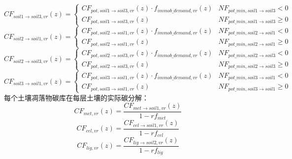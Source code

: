 \begin{equation}
    CF_{soil1 \rightarrow soil3, vr}(z)=\left\{\begin{array}{ll} CF_{pot, soil1 \rightarrow soil3, vr}(z) \cdot f_{immob\_demand, vr}(z) & NF_{pot\_{min, soil1 \rightarrow soil3}} <0 \\ 
    CF_{pot, soil1 \rightarrow soil3, vr}(z) & NF_{pot\_{min, soil1 \rightarrow soil3}} \geqslant 0
  \end{array}\right.
\end{equation}
\begin{equation}
    CF_{soil2 \rightarrow soil1, vr}(z)=\left\{\begin{array}{ll} CF_{pot, soil2 \rightarrow soil1, vr}(z) \cdot f_{immob\_demand, vr}(z) & NF_{pot\_{min, soil2 \rightarrow soil1}} <0 \\ 
    CF_{pot, soil2 \rightarrow soil1, vr}(z) & NF_{pot\_{min, soil2 \rightarrow soil1}} \geqslant 0
   \end{array}\right.
\end{equation}
\begin{equation}
    CF_{soil2 \rightarrow soil3, vr}(z)=\left\{\begin{array}{ll} CF_{pot, soil2 \rightarrow soil3, vr}(z) \cdot f_{immob\_demand, vr}(z) & NF_{pot\_{min, soil2 \rightarrow soil3}} <0 \\ 
    CF_{pot, soil2 \rightarrow soil3, vr}(z) & NF_{pot\_{min, soil2 \rightarrow soil3}} \geqslant 0
   \end{array}\right.
\end{equation}
\begin{equation}
    CF_{soil3 \rightarrow soil1, vr}(z)=\left\{\begin{array}{ll} CF_{pot, soil3 \rightarrow soil1, vr}(z) \cdot f_{immob\_demand, vr}(z) & NF_{pot\_{min, soil3 \rightarrow soil1}} <0 \\ 
    CF_{pot, soil3 \rightarrow soil1, vr}(z) & NF_{pot\_{min, soil3 \rightarrow soil1}} \geqslant 0
   \end{array}\right.
\end{equation}
每个土壤凋落物碳库在每层土壤的实际碳分解：
\begin{equation}
CF_{met, vr}(z)=\frac{CF_{met \rightarrow { soil1,vr }}(z)}{1-r f_{met}}
\end{equation}
\begin{equation}
C F_{cel, vr}(z)=\frac{C F_{cel \rightarrow soil1, vr}(z)}{1-r f_{cel}}
\end{equation}
\begin{equation}
C F_{lig, vr}(z)=\frac{C F_{lig \rightarrow soil2, vr}(z)}{1-r f_{lig}}
\end{equation}
